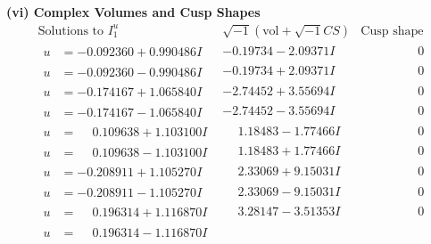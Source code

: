 \documentclass[1p]{elsarticle_modified}
\theoremstyle{definition}
\newcommand{\I}{\sqrt{-1}}
\begin{document}
\newpage\flushleft \textbf{(vi) Complex Volumes and Cusp Shapes}
$$\begin{array}{c|c|c}  
\text{Solutions to }I^u_{1}& \I (\text{vol} + \sqrt{-1}CS) & \text{Cusp shape}\\
 \hline 
\begin{aligned}
u &= -0.092360 + 0.990486 I\end{aligned}
 & -0.19734 - 2.09371 I & \phantom{-0.000000 } 0 \\ \hline\begin{aligned}
u &= -0.092360 - 0.990486 I\end{aligned}
 & -0.19734 + 2.09371 I & \phantom{-0.000000 } 0 \\ \hline\begin{aligned}
u &= -0.174167 + 1.065840 I\end{aligned}
 & -2.74452 + 3.55694 I & \phantom{-0.000000 } 0 \\ \hline\begin{aligned}
u &= -0.174167 - 1.065840 I\end{aligned}
 & -2.74452 - 3.55694 I & \phantom{-0.000000 } 0 \\ \hline\begin{aligned}
u &= \phantom{-}0.109638 + 1.103100 I\end{aligned}
 & \phantom{-}1.18483 - 1.77466 I & \phantom{-0.000000 } 0 \\ \hline\begin{aligned}
u &= \phantom{-}0.109638 - 1.103100 I\end{aligned}
 & \phantom{-}1.18483 + 1.77466 I & \phantom{-0.000000 } 0 \\ \hline\begin{aligned}
u &= -0.208911 + 1.105270 I\end{aligned}
 & \phantom{-}2.33069 + 9.15031 I & \phantom{-0.000000 } 0 \\ \hline\begin{aligned}
u &= -0.208911 - 1.105270 I\end{aligned}
 & \phantom{-}2.33069 - 9.15031 I & \phantom{-0.000000 } 0 \\ \hline\begin{aligned}
u &= \phantom{-}0.196314 + 1.116870 I\end{aligned}
 & \phantom{-}3.28147 - 3.51353 I & \phantom{-0.000000 } 0 \\ \hline\begin{aligned}
u &= \phantom{-}0.196314 - 1.116870 I\end{aligned}

\end{array}$$
\end{document}
